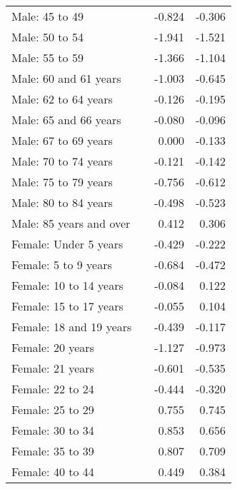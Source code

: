 \begin{center}
\begin{small}
\begin{longtable}{l D{.}{.}{2.3} D{.}{.}{2.3} D{.}{.}{2.3} }
Male: 45 to 49                                 &        & -0.824 & -0.306 \\
Male: 50 to 54                                 &        & -1.941 & -1.521 \\
Male: 55 to 59                                 &        & -1.366 & -1.104 \\
Male: 60 and 61 years                          &        & -1.003 & -0.645 \\
Male: 62 to 64 years                           &        & -0.126 & -0.195 \\
Male: 65 and 66 years                          &        & -0.080 & -0.096 \\
Male: 67 to 69 years                           &        & 0.000  & -0.133 \\
Male: 70 to 74 years                           &        & -0.121 & -0.142 \\
Male: 75 to 79 years                           &        & -0.756 & -0.612 \\
Male: 80 to 84 years                           &        & -0.498 & -0.523 \\
Male: 85 years and over                        &        & 0.412  & 0.306  \\
Female: Under 5 years                          &        & -0.429 & -0.222 \\
Female: 5 to 9 years                           &        & -0.684 & -0.472 \\
Female: 10 to 14 years                         &        & -0.084 & 0.122  \\
Female: 15 to 17 years                         &        & -0.055 & 0.104  \\
Female: 18 and 19 years                        &        & -0.439 & -0.117 \\
Female: 20 years                               &        & -1.127 & -0.973 \\
Female: 21 years                               &        & -0.601 & -0.535 \\
Female: 22 to 24                               &        & -0.444 & -0.320 \\
Female: 25 to 29                               &        & 0.755  & 0.745  \\
Female: 30 to 34                               &        & 0.853  & 0.656  \\
Female: 35 to 39                               &        & 0.807  & 0.709  \\
Female: 40 to 44                               &        & 0.449  & 0.384  \\

\end{longtable}
\end{small}
\end{center}
